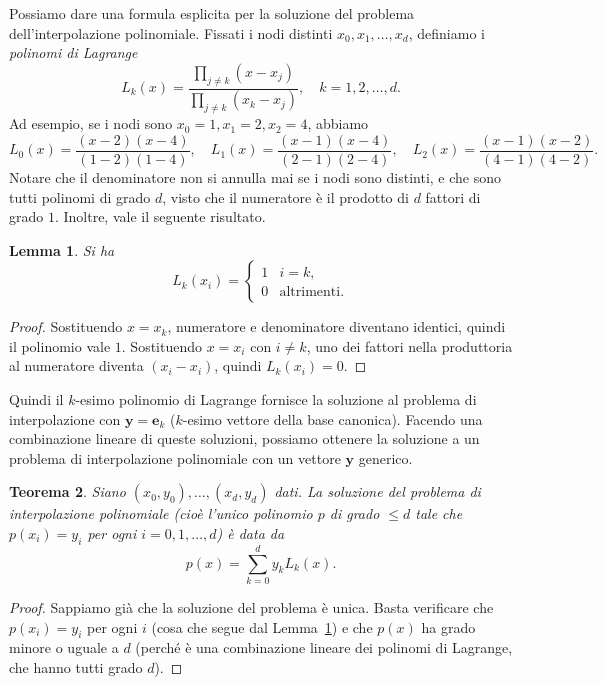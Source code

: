 \documentclass[a4paper]{report}
\newtheorem{theorem}{Teorema}[chapter]
\newtheorem{lemma}[theorem]{Lemma}
\theoremstyle{definiton}
\theoremstyle{remark}
\newcommand{\e}{\mathbf{e}}
\begin{document}
Possiamo dare una formula esplicita per la soluzione del problema dell'interpolazione polinomiale. Fissati i nodi distinti $x_0,x_1,\dots,x_d$, definiamo i \emph{polinomi di Lagrange}
\[
L_k(x) = \frac{\prod_{j\neq k}(x - x_j)}{\prod_{j\neq k}(x_k - x_j)}, \quad k=1,2,\dots,d.
\]
Ad esempio, se i nodi sono $x_0 = 1, x_1 = 2, x_2 = 4$, abbiamo
\[
L_0(x) = \frac{(x-2)(x-4)}{(1-2)(1-4)}, \quad L_1(x) = \frac{(x-1)(x-4)}{(2-1)(2-4)}, \quad L_2(x) = \frac{(x-1)(x-2)}{(4-1)(4-2)}.
\]
Notare che il denominatore non si annulla mai se i nodi sono distinti, e che sono tutti polinomi di grado $d$, visto che il numeratore è il prodotto di $d$ fattori di grado $1$. Inoltre, vale il seguente risultato.
\begin{lemma} \label{lem:polylagrange}
Si ha
\[
L_k(x_i) = \begin{cases}
1 & i=k,\\
0 & \text{altrimenti}.
\end{cases}
\]
\end{lemma}
\begin{proof}
Sostituendo $x = x_k$, numeratore e denominatore diventano identici, quindi il polinomio vale $1$. Sostituendo $x = x_i$ con $i\neq k$, uno dei fattori nella produttoria al numeratore diventa $(x_i-x_i)$, quindi $L_k(x_i) = 0$.
\end{proof}
Quindi il $k$-esimo polinomio di Lagrange fornisce la soluzione al problema di interpolazione con $\mathbf{y} = \e_k$ ($k$-esimo vettore della base canonica). Facendo una combinazione lineare di queste soluzioni, possiamo ottenere la soluzione a un problema di interpolazione polinomiale con un vettore $\mathbf{y}$ generico.
\begin{theorem}
Siano $(x_0,y_0),\dots,(x_d,y_d)$ dati. La soluzione del problema di interpolazione polinomiale (cioè l'unico polinomio $p$ di grado $\leq d$ tale che $p(x_i)=y_i$ per ogni $i=0,1,\dots,d$) è data da
\[
p(x) = \sum_{k=0}^d y_k L_k(x).
\]
\end{theorem}
\begin{proof}
Sappiamo già che la soluzione del problema è unica. Basta verificare che $p(x_i) = y_i$ per ogni $i$ (cosa che segue dal Lemma~\ref{lem:polylagrange}) e che $p(x)$ ha grado minore o uguale a $d$ (perché è una combinazione lineare dei polinomi di Lagrange, che hanno tutti grado $d$). 
\end{proof}

\end{document}
